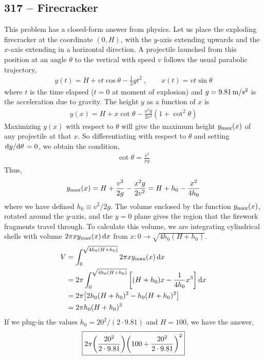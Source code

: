 \documentclass{article}
\begin{document}
\subsection*{317 -- Firecracker}
This problem has a closed-form answer from physics.
Let us place the exploding firecracker at the coordinate $(0, H)$, with the $y$-axis extending upwards and the $x$-axis extending in a horizontal direction.
A projectile launched from this position at an angle $\theta$ to the vertical with speed $v$ follows the usual parabolic trajectory,
\begin{align*}
	y(t) = H + v t \cos \theta - \frac{1}{2} gt^2 ~, \qquad x(t) = v t \sin\theta
\end{align*}
where $t$ is the time elapsed ($t=0$ at moment of explosion) and $g = 9.81 \, {\rm m/s^2}$ is the acceleration due to gravity.
The height $y$ as a function of $x$ is
\begin{align*}
	y(x) = H + x \cot \theta - \frac{x^2 g}{2 v^2}(1 + \cot^2\theta)
\end{align*}
Maximizing $y(x)$ with respect to $\theta$ will give the maximum height $y_{\rm max}(x)$ of any projectile at that $x$.
So differentiating with respect to $\theta$ and setting $\dv*{y}{\theta} = 0$, we obtain the condition,
\begin{align*}
	\cot\theta = \frac{v^2}{xg}
\end{align*}
Thus,
\begin{align*}
	y_{\rm max}(x) = H + \frac{v^2}{2g} - \frac{x^2 g}{2 v^2} = H + h_0 - \frac{x^2}{4 h_0}
\end{align*}
where we have defined $h_0 \equiv v^2 / 2g$.
The volume enclosed by the function $y_{\rm max}(x)$, rotated around the $y$-axis, and the $y=0$ plane gives the region that the firework fragments travel through.
To calculate this volume, we are integrating cylindrical shells with volume $2\pi x y_{\rm max}(x) \dd{x}$ from $x:0 \to \sqrt{4h_0(H + h_0)}$.
\begin{align*}
	V &= \int_0^{\sqrt{4h_0(H + h_0)}}  2\pi x y_{\rm max}(x) \dd{x} \\
	&= 2\pi \int_0^{\sqrt{4h_0(H + h_0)}} \qty[ (H + h_0)x - \frac{1}{4h_0} x^3 ] \dd{x} \\
	&= 2\pi \qty[2h_0(H + h_0)^2 - h_0 (H + h_0)^2 ] \\
	&= 2 \pi h_0 (H + h_0)^3
\end{align*}
If we plug-in the values $h_0 = 20^2/(2 \cdot 9.81)$ and $H = 100$, we have the answer,
\begin{align*}
	\boxed{ 2 \pi \qty(\frac{20^2}{2 \cdot 9.81}) \qty(100 + \frac{20^2}{2 \cdot 9.81})^2 }
\end{align*}
\end{document}
